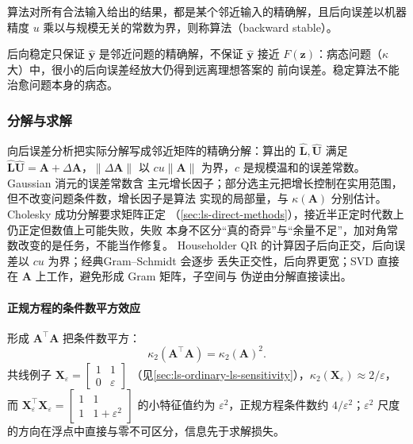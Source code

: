 \begin{definition}[后向稳定]
\label{def:matrix-analysis-backward-stability}
算法对所有合法输入给出的结果，都是某个邻近输入的精确解，且后向误差以机器精度
$u$ 乘以与规模无关的常数为界，则称算法（backward stable）。
\end{definition}

后向稳定只保证 $\widehat{\bm y}$ 是邻近问题的精确解，不保证 $\widehat{\bm y}$ 接近
$F(\bm z)$：病态问题（$\kappa$ 大）中，很小的后向误差经放大仍得到远离理想答案的
前向误差。稳定算法不能治愈问题本身的病态。

\subsubsection{分解与求解}
\label{sec:ls-factorization-solve}

向后误差分析把实际分解写成邻近矩阵的精确分解：算出的 $\widehat{\bm L},\widehat{\bm U}$
满足 $\widehat{\bm L}\widehat{\bm U}=\bm A+\Delta\bm A$，$\lVert\Delta\bm A\rVert$
以 $cu\lVert\bm A\rVert$ 为界，$c$ 是规模温和的误差常数。Gaussian 消元的误差常数含
主元增长因子；部分选主元把增长控制在实用范围，但不改变问题条件数，增长因子是算法
实现的局部量，与 $\kappa(\bm A)$ 分别估计。Cholesky 成功分解要求矩阵正定
（\ref{sec:ls-direct-methods}），接近半正定时代数上仍正定但数值上可能失败，失败
本身不区分“真的奇异”与“余量不足”，加对角常数改变的是任务，不能当作修复。
Householder QR 的计算因子后向正交，后向误差以 $cu$ 为界；经典Gram--Schmidt 会逐步
丢失正交性，后向界更宽；SVD 直接在 $\bm A$ 上工作，避免形成 Gram 矩阵，子空间与
伪逆由分解直接读出。

\paragraph{正规方程的条件数平方效应}

形成 $\bm A^\top\bm A$ 把条件数平方：
\begin{equation}
 \kappa_2(\bm A^\top\bm A)=\kappa_2(\bm A)^2.
 \label{eq:matrix-analysis-normal-equation-condition-square}
\end{equation}
共线例子 $\bm X_\varepsilon=
\left[\begin{smallmatrix}1&1\\0&\varepsilon\end{smallmatrix}\right]$
（见\ref{sec:ls-ordinary-ls-sensitivity}），$\kappa_2(\bm X_\varepsilon)\approx2/\varepsilon$，
而 $\bm X_\varepsilon^\top\bm X_\varepsilon=
\left[\begin{smallmatrix}1&1\\1&1+\varepsilon^2\end{smallmatrix}\right]$
的小特征值约为 $\varepsilon^2$，正规方程条件数约 $4/\varepsilon^2$；$\varepsilon^2$
尺度的方向在浮点中直接与零不可区分，信息先于求解损失。

